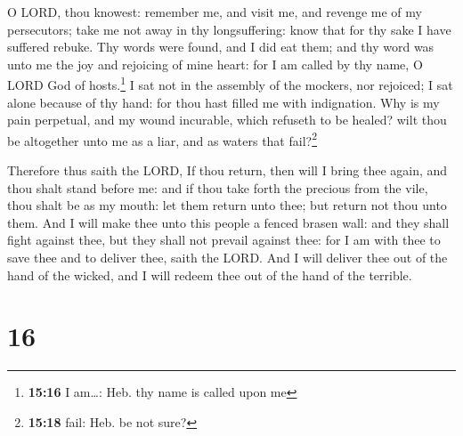  O LORD, thou knowest: remember me, and visit me, and
revenge me of my persecutors; take me not away in thy longsuffering:
know that for thy sake I have suffered rebuke.  Thy words
were found, and I did eat them; and thy word was unto me the joy and
rejoicing of mine heart: for I am called by thy name, O LORD God of
hosts.\footnote{\textbf{15:16} I am\ldots: Heb. thy name is called upon
  me}  I sat not in the assembly of the mockers, nor
rejoiced; I sat alone because of thy hand: for thou hast filled me with
indignation.  Why is my pain perpetual, and my wound
incurable, which refuseth to be healed? wilt thou be altogether unto me
as a liar, and as waters that fail?\footnote{\textbf{15:18} fail: Heb.
  be not sure?}

 Therefore thus saith the LORD, If thou return, then will
I bring thee again, and thou shalt stand before me: and if thou take
forth the precious from the vile, thou shalt be as my mouth: let them
return unto thee; but return not thou unto them.  And I
will make thee unto this people a fenced brasen wall: and they shall
fight against thee, but they shall not prevail against thee: for I am
with thee to save thee and to deliver thee, saith the LORD.
 And I will deliver thee out of the hand of the wicked,
and I will redeem thee out of the hand of the terrible.

\hypertarget{section-15}{%
\section{16}\label{section-15}}

